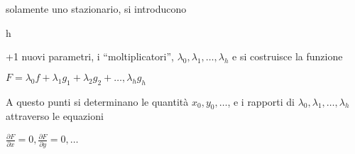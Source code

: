 solamente uno stazionario, si introducono \begin{it}
                                           h
                                          \end{it}+1 nuovi parametri, i ``moltiplicatori'', 
\begin{math}
 \lambda_0, \lambda_1, \dots, \lambda_h
\end{math} e si costruisce la funzione
\begin{center}
 \begin{math}
  F = \lambda_0f + \lambda_1g_1 + \lambda_2g_2+ \dots, \lambda_hg_h
 \end{math}

\end{center}
A questo punti si determinano le quantit\`a \begin{math}
              x_0, y_0, \dots
             \end{math}, e i rapporti di \begin{math}
 \lambda_0, \lambda_1, \dots, \lambda_h
\end{math} attraverso le equazioni
\begin{center}
 \begin{math}
  \frac{\partial F}{\partial{x}} = 0, \frac{\partial F}{\partial{y}} = 0, \dots 
 \end{math}

\end{center}

